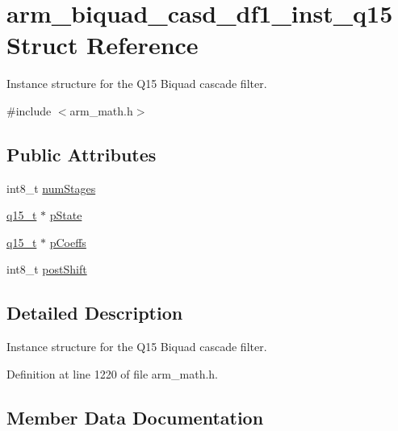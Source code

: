 \hypertarget{structarm__biquad__casd__df1__inst__q15}{}\section{arm\+\_\+biquad\+\_\+casd\+\_\+df1\+\_\+inst\+\_\+q15 Struct Reference}
\label{structarm__biquad__casd__df1__inst__q15}


Instance structure for the Q15 Biquad cascade filter.  




{\ttfamily \#include $<$arm\+\_\+math.\+h$>$}

\subsection*{Public Attributes}
\begin{DoxyCompactItemize}
\item 
int8\+\_\+t \hyperlink{structarm__biquad__casd__df1__inst__q15_ad6d95e70abcf4ff1300181415ad92153}{num\+Stages}
\item 
\hyperlink{arm__math_8h_ab5a8fb21a5b3b983d5f54f31614052ea}{q15\+\_\+t} $\ast$ \hyperlink{structarm__biquad__casd__df1__inst__q15_a5481104ef2f8f81360b80b47d69ae932}{p\+State}
\item 
\hyperlink{arm__math_8h_ab5a8fb21a5b3b983d5f54f31614052ea}{q15\+\_\+t} $\ast$ \hyperlink{structarm__biquad__casd__df1__inst__q15_a1edaacdebb5b09d7635bf20c779855fc}{p\+Coeffs}
\item 
int8\+\_\+t \hyperlink{structarm__biquad__casd__df1__inst__q15_ada7e9d6269e6ed4eacf8f68729e9832d}{post\+Shift}
\end{DoxyCompactItemize}


\subsection{Detailed Description}
Instance structure for the Q15 Biquad cascade filter. 

Definition at line 1220 of file arm\+\_\+math.\+h.



\subsection{Member Data Documentation}
\mbox{\label{structarm__biquad__casd__df1__inst__q15_ad6d95e70abcf4ff1300181415ad92153}} 
